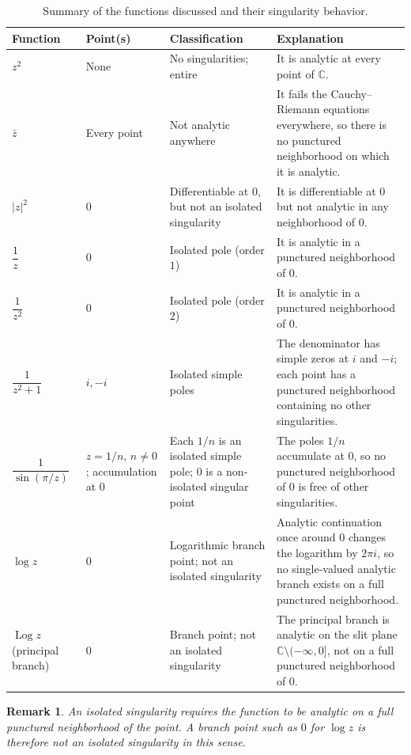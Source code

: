 \documentclass{report}
\newtheorem{remark}{Remark}
\begin{document}
\begin{table}[ht]
    \centering
    \small
    \caption{Summary of the functions discussed and their singularity behavior.}
    \setlength{\tabcolsep}{3pt}
    \begin{tabular}{|p{1.8cm}|p{1.2cm}|p{2.8cm}|p{5.4cm}|}
        \hline
        Function & Point(s) & Classification & Explanation \\ \hline
        $z^2$ & None & No singularities; entire & It is analytic at every point of $\mathbb{C}$. \\ \hline
        $\bar z$ & Every point & Not analytic anywhere & It fails the Cauchy--Riemann equations everywhere, so there is no punctured neighborhood on which it is analytic. \\ \hline
        $|z|^2$ & $0$ & Differentiable at $0$, but not an isolated singularity & It is differentiable at $0$ but not analytic in any neighborhood of $0$. \\ \hline
        $\dfrac{1}{z}$ & $0$ & Isolated pole (order $1$) & It is analytic in a punctured neighborhood of $0$. \\ \hline
        $\dfrac{1}{z^2}$ & $0$ & Isolated pole (order $2$) & It is analytic in a punctured neighborhood of $0$. \\ \hline
        $\dfrac{1}{z^2+1}$ & $i,-i$ & Isolated simple poles & The denominator has simple zeros at $i$ and $-i$; each point has a punctured neighborhood containing no other singularities. \\ \hline
        $\dfrac{1}{\sin(\pi/z)}$ & $z=1/n$, $n\ne0$; accumulation at $0$ & Each $1/n$ is an isolated simple pole; $0$ is a non-isolated singular point & The poles $1/n$ accumulate at $0$, so no punctured neighborhood of $0$ is free of other singularities. \\ \hline
        $\log z$ & $0$ & Logarithmic branch point; not an isolated singularity & Analytic continuation once around $0$ changes the logarithm by $2\pi i$, so no single-valued analytic branch exists on a full punctured neighborhood. \\ \hline
        $\operatorname{Log}z$ (principal branch) & $0$ & Branch point; not an isolated singularity & The principal branch is analytic on the slit plane $\mathbb{C}\setminus(-\infty,0]$, not on a full punctured neighborhood of $0$. \\ \hline
    \end{tabular}
\end{table}

\begin{remark}
    An isolated singularity requires the function to be analytic on a full
    punctured neighborhood of the point. A branch point such as $0$ for
    $\log z$ is therefore not an isolated singularity in this sense.
\end{remark}
\end{document}

